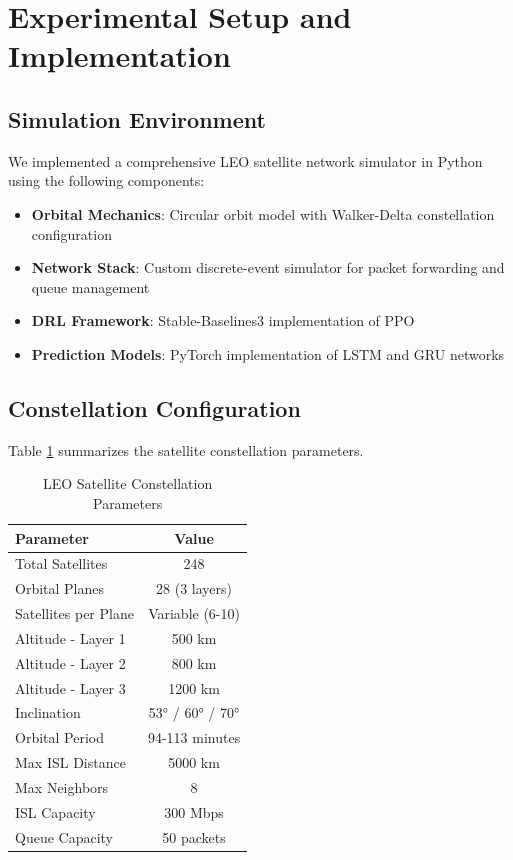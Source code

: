 
\section{Experimental Setup and Implementation}

\subsection{Simulation Environment}

We implemented a comprehensive LEO satellite network simulator in Python using the following components:

\begin{itemize}
\item \textbf{Orbital Mechanics}: Circular orbit model with Walker-Delta constellation configuration
\item \textbf{Network Stack}: Custom discrete-event simulator for packet forwarding and queue management
\item \textbf{DRL Framework}: Stable-Baselines3 implementation of PPO \cite{raffin2021stable}
\item \textbf{Prediction Models}: PyTorch implementation of LSTM and GRU networks
\end{itemize}

\subsection{Constellation Configuration}

Table \ref{tab:constellation} summarizes the satellite constellation parameters.

\begin{table}[h]
\centering
\caption{LEO Satellite Constellation Parameters}
\label{tab:constellation}
\begin{tabular}{|l|c|}
\hline
\textbf{Parameter} & \textbf{Value} \\
\hline
\hline
Total Satellites & 248 \\
Orbital Planes & 28 (3 layers) \\
Satellites per Plane & Variable (6-10) \\
Altitude - Layer 1 & 500 km \\
Altitude - Layer 2 & 800 km \\
Altitude - Layer 3 & 1200 km \\
Inclination & 53° / 60° / 70° \\
Orbital Period & 94-113 minutes \\
Max ISL Distance & 5000 km \\
Max Neighbors & 8 \\
ISL Capacity & 300 Mbps \\
Queue Capacity & 50 packets \\
\hline
\end{tabular}
\end{table}

